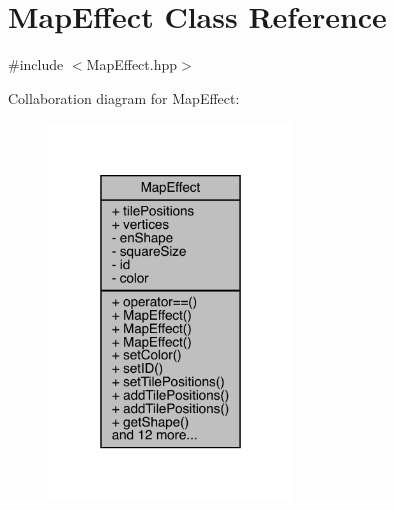 \hypertarget{class_map_effect}{}\section{Map\+Effect Class Reference}
\label{class_map_effect}


{\ttfamily \#include $<$Map\+Effect.\+hpp$>$}



Collaboration diagram for Map\+Effect\+:\nopagebreak
\begin{figure}[H]
\begin{center}
\leavevmode
\includegraphics[width=184pt]{d8/d21/class_map_effect__coll__graph}
\end{center}
\end{figure}
